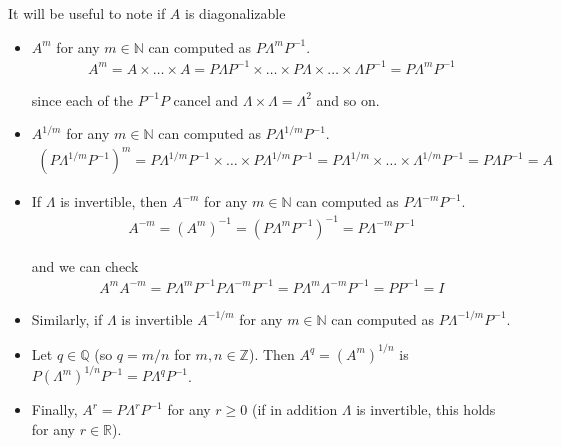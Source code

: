 \documentclass{article}
\begin{document}
It will be useful to note if $A$ is diagonalizable
\begin{itemize}[label=$\bullet$]
  \item $A^m$ for any $m \in \mathbb{N}$ can computed as $P \Lambda^m P^{-1}$.
    \begin{align*}
      A^m
      =
      A
      \times \ldots \times
      A
      =
      P \Lambda P^{-1}
      \times \ldots \times
      P \Lambda \times \ldots \times \Lambda P^{-1}
      =
      P \Lambda^m P^{-1}
    \end{align*}

    since each of the $P^{-1} P$ cancel and $\Lambda \times \Lambda = \Lambda^2$ and so on.

  \item $A^{1/m}$ for any $m \in \mathbb{N}$ can computed as $P \Lambda^{1/m} P^{-1}$.
    \begin{align*}
      \left(
        P \Lambda^{1/m} P^{-1}
      \right)^m
      =
      P \Lambda^{1/m} P^{-1}
      \times \ldots \times
      P \Lambda^{1/m} P^{-1}
      =
      P \Lambda^{1/m} \times \ldots \times \Lambda^{1/m} P^{-1}
      =
      P \Lambda P^{-1}
      =
      A
    \end{align*}

  \item If $\Lambda$ is invertible, then $A^{-m}$ for any $m \in \mathbb{N}$ can computed as $P \Lambda^{-m} P^{-1}$.
    \begin{align*}
      A^{-m}
      =
      \left(
        A^m
      \right)^{-1}
      =
      \left(
        P \Lambda^m P^{-1}
      \right)^{-1}
      =
      P \Lambda^{-m} P^{-1}
    \end{align*}

    and we can check
    \begin{align*}
      A^m A^{-m}
      =
      P \Lambda^{m} P^{-1} P \Lambda^{-m} P^{-1}
      =
      P \Lambda^{m} \Lambda^{-m} P^{-1}
      =
      P P^{-1}
      =
      I
    \end{align*}

  \item Similarly, if $\Lambda$ is invertible $A^{-1/m}$ for any $m \in \mathbb{N}$ can computed as $P \Lambda^{-1/m} P^{-1}$.

  \item Let $q \in \mathbb{Q}$ (so $q = m/n$ for $m, n \in \mathbb{Z}$). Then $A^q = (A^m)^{1/n}$ is $P (\Lambda^m)^{1/n} P^{-1} = P \Lambda^q P^{-1}$.

  \item Finally, $A^r = P \Lambda^r P^{-1}$ for any $r \ge 0$ (if in addition $\Lambda$ is invertible, this holds for any $r \in \mathbb{R}$).
\end{itemize}
\end{document}
